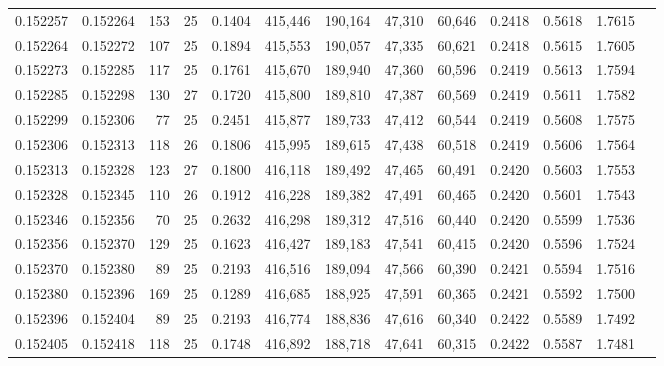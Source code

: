 \begin{tabular}{rrrrrrrrrrrrr}
0.152257 & 0.152264 & 153 &  25 &                                     0.1404 & 415,446 & 190,164 &  47,310 &  60,646 & 0.2418 & 0.5618 & 1.7615 \\
0.152264 & 0.152272 & 107 &  25 &                                     0.1894 & 415,553 & 190,057 &  47,335 &  60,621 & 0.2418 & 0.5615 & 1.7605 \\
0.152273 & 0.152285 & 117 &  25 &                                     0.1761 & 415,670 & 189,940 &  47,360 &  60,596 & 0.2419 & 0.5613 & 1.7594 \\
0.152285 & 0.152298 & 130 &  27 &                                     0.1720 & 415,800 & 189,810 &  47,387 &  60,569 & 0.2419 & 0.5611 & 1.7582 \\
0.152299 & 0.152306 &  77 &  25 &                                     0.2451 & 415,877 & 189,733 &  47,412 &  60,544 & 0.2419 & 0.5608 & 1.7575 \\
0.152306 & 0.152313 & 118 &  26 &                                     0.1806 & 415,995 & 189,615 &  47,438 &  60,518 & 0.2419 & 0.5606 & 1.7564 \\
0.152313 & 0.152328 & 123 &  27 &                                     0.1800 & 416,118 & 189,492 &  47,465 &  60,491 & 0.2420 & 0.5603 & 1.7553 \\
0.152328 & 0.152345 & 110 &  26 &                                     0.1912 & 416,228 & 189,382 &  47,491 &  60,465 & 0.2420 & 0.5601 & 1.7543 \\
0.152346 & 0.152356 &  70 &  25 &                                     0.2632 & 416,298 & 189,312 &  47,516 &  60,440 & 0.2420 & 0.5599 & 1.7536 \\
0.152356 & 0.152370 & 129 &  25 &                                     0.1623 & 416,427 & 189,183 &  47,541 &  60,415 & 0.2420 & 0.5596 & 1.7524 \\
0.152370 & 0.152380 &  89 &  25 &                                     0.2193 & 416,516 & 189,094 &  47,566 &  60,390 & 0.2421 & 0.5594 & 1.7516 \\
0.152380 & 0.152396 & 169 &  25 &                                     0.1289 & 416,685 & 188,925 &  47,591 &  60,365 & 0.2421 & 0.5592 & 1.7500 \\
0.152396 & 0.152404 &  89 &  25 &                                     0.2193 & 416,774 & 188,836 &  47,616 &  60,340 & 0.2422 & 0.5589 & 1.7492 \\
0.152405 & 0.152418 & 118 &  25 &                                     0.1748 & 416,892 & 188,718 &  47,641 &  60,315 & 0.2422 & 0.5587 & 1.7481 \\

\end{tabular}
